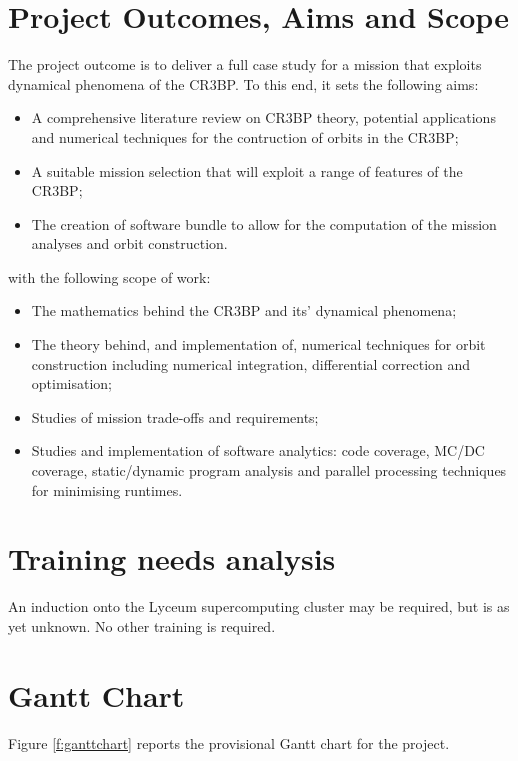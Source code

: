 \documentclass[paper=letter, fontsize=11pt]{article}
\begin{document}
\section*{Project Outcomes, Aims and Scope}

	The project outcome is to deliver a full case study for a mission that exploits dynamical phenomena of the CR3BP. To this end, it sets the following aims:

			\begin{itemize}
				\item A comprehensive literature review on CR3BP theory, potential applications and numerical techniques for the contruction of orbits in the CR3BP;
				\item A suitable mission selection that will exploit a range of features of the CR3BP;
				\item The creation of software bundle to allow for the computation of the mission analyses and orbit construction.
			\end{itemize}

			with the following scope of work:

	\begin{itemize}
		\item  The mathematics behind the CR3BP and its' dynamical phenomena;
		\item The theory behind, and implementation of, numerical techniques for orbit construction including numerical integration, differential correction and optimisation;
		\item Studies of mission trade-offs and requirements;
		\item Studies and implementation of software analytics: code coverage, MC/DC coverage, static/dynamic program analysis and parallel processing techniques for minimising runtimes.
	\end{itemize}


\section*{Training needs analysis}

An induction onto the Lyceum supercomputing cluster may be required, but is as yet unknown. No other training is required.

\section*{Gantt Chart}

Figure \ref{f:ganttchart} reports the provisional Gantt chart for the project.
\end{document}
